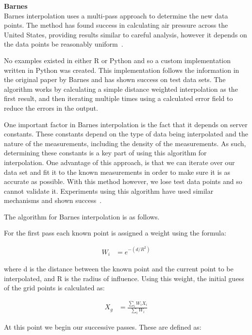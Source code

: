 			\textbf{Barnes}\label{datavalidation_barnes} \\

				Barnes interpolation uses a multi-pass approach to determine the new data points. The method has found success in calculating air pressure across the United States, providing results similar to careful analysis, however it depends on the data points be reasonably uniform~\cite{barnesinterpolation}.

				No examples existed in either R or Python and so a custom implementation written in Python was created. This implementation follows the information in the original paper by Barnes and has shown success on test data sets. The algorithm works by calculating a simple distance weighted interpolation as the first result, and then iterating multiple times using a calculated error field to reduce the errors in the output. 

				One important factor in Barnes interpolation is the fact that it depends on server constants. These constants depend on the type of data being interpolated and the nature of the measurements, including the density of the measurements. As such, determining these constants is a key part of using this algorithm for interpolation. One advantage of this approach, is that we can iterate over our data set and fit it to the known measurements in order to make sure it is as accurate as possible. With this method however, we lose test data points and so cannot validate it. Experiments using this algorithm have used similar mechanisms and shown success~\cite{pmconcentrationmaps}.

				The algorithm for Barnes interpolation is as follows.

				For the first pass each known point is assigned a weight using the formula: 

				\begin{align*}
					W_{i} &= e^{-(d/R^{2})}
				\end{align*}
				
				where d is the distance between the known point and the current point to be interpolated, and R is the radius of influence. Using this weight, the initial guess of the grid points is calculated as: 
				
				\begin{align*}
					X_{g} &= \frac{\sum_{i}{W_{i}X_{i}}}{\sum_{i}{W_{i}}}
				\end{align*}

				At this point we begin our successive passes. These are defined as:

